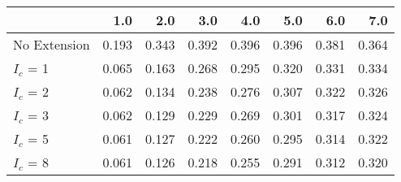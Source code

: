 \begin{tabular}{lrrrrrrr}
\toprule
{} &   1.0 &   2.0 &   3.0 &   4.0 &   5.0 &   6.0 &   7.0 \\
\midrule
No Extension & 0.193 & 0.343 & 0.392 & 0.396 & 0.396 & 0.381 & 0.364 \\
$I_c$ = 1    & 0.065 & 0.163 & 0.268 & 0.295 & 0.320 & 0.331 & 0.334 \\
$I_c$ = 2    & 0.062 & 0.134 & 0.238 & 0.276 & 0.307 & 0.322 & 0.326 \\
$I_c$ = 3    & 0.062 & 0.129 & 0.229 & 0.269 & 0.301 & 0.317 & 0.324 \\
$I_c$ = 5    & 0.061 & 0.127 & 0.222 & 0.260 & 0.295 & 0.314 & 0.322 \\
$I_c$ = 8    & 0.061 & 0.126 & 0.218 & 0.255 & 0.291 & 0.312 & 0.320 \\
\bottomrule
\end{tabular}
